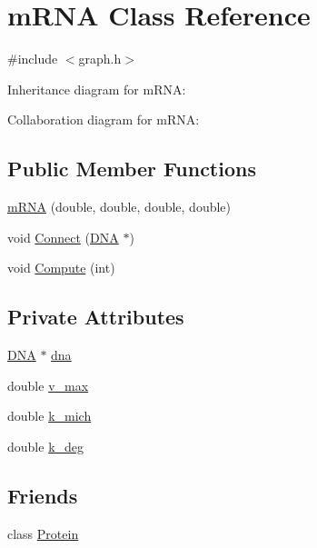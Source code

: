 \hypertarget{classm_r_n_a}{\section{m\-R\-N\-A Class Reference}
\label{classm_r_n_a}
}


{\ttfamily \#include $<$graph.\-h$>$}



Inheritance diagram for m\-R\-N\-A\-:


Collaboration diagram for m\-R\-N\-A\-:
\subsection*{Public Member Functions}
\begin{DoxyCompactItemize}
\item 
\hyperlink{classm_r_n_a_a1fc26dc1fe542e23f9d374533600b9fb}{m\-R\-N\-A} (double, double, double, double)
\item 
void \hyperlink{classm_r_n_a_ac010324e6b1dc61fb8e1391b219acb2c}{Connect} (\hyperlink{class_d_n_a}{D\-N\-A} $\ast$)
\item 
void \hyperlink{classm_r_n_a_a490f8026d612c405ce2678a4d15cf7a8}{Compute} (int)
\end{DoxyCompactItemize}
\subsection*{Private Attributes}
\begin{DoxyCompactItemize}
\item 
\hyperlink{class_d_n_a}{D\-N\-A} $\ast$ \hyperlink{classm_r_n_a_ace67bd5431ec023732e05049e5ca9a4b}{dna}
\item 
double \hyperlink{classm_r_n_a_a07cdcbe61a2af4fc74751521e0c7920e}{v\-\_\-max}
\item 
double \hyperlink{classm_r_n_a_ace3b5460f5ed647cbe52e6a86e8d6ef7}{k\-\_\-mich}
\item 
double \hyperlink{classm_r_n_a_ac4e84c4700ca924196809e36fa17c5b7}{k\-\_\-deg}
\end{DoxyCompactItemize}
\subsection*{Friends}
\begin{DoxyCompactItemize}
\item 
class \hyperlink{classm_r_n_a_a2cc8b86817f46f61585ecf591984f8eb}{Protein}
\end{DoxyCompactItemize}
